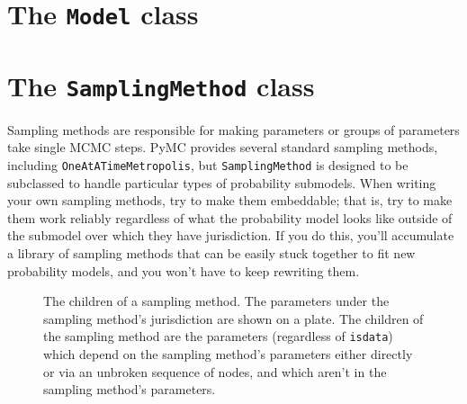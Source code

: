 \documentclass[]{book}
\begin{document}
\section{The \texttt{Model} class}\label{sec:Model}


\section{The \texttt{SamplingMethod} class}\label{sec:SamplingMethod}
Sampling methods are responsible for making parameters or groups of parameters take single MCMC steps. PyMC provides several standard sampling methods, including \texttt{OneAtATimeMetropolis}, but \texttt{SamplingMethod} is designed to be subclassed to handle particular types of probability submodels. When writing your own sampling methods, try to make them embeddable; that is, try to make them work reliably regardless of what the probability model looks like outside of the submodel over which they have jurisdiction. If you do this, you'll accumulate a library of sampling methods that can be easily stuck together to fit new probability models, and you won't have to keep rewriting them.

\begin{figure}[hhhhhhhhh]
    \centering
    \caption{The children of a sampling method. The parameters under the sampling method's jurisdiction are shown on a plate. The children of the sampling method are the parameters (regardless of \texttt{isdata}) which depend on the sampling method's parameters either directly or via an unbroken sequence of nodes, and which aren't in the sampling method's parameters.}
    \label{fig:sampmethod_children}
\end{figure}
\end{document}
